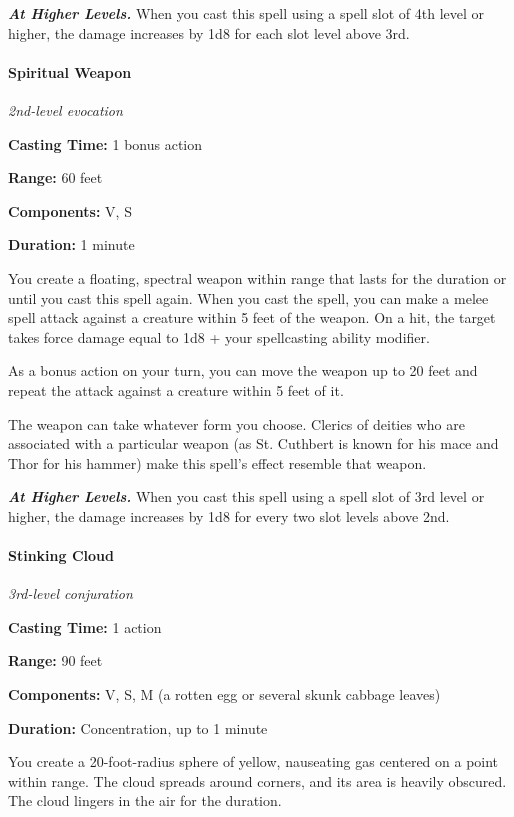 \documentclass[
]{article}
\begin{document}
\emph{\textbf{At Higher Levels.}} When you cast this spell using a spell
slot of 4th level or higher, the damage increases by 1d8 for each slot
level above 3rd.

\hypertarget{spiritual-weapon}{%
\paragraph{Spiritual Weapon}\label{spiritual-weapon}}

\emph{2nd-level evocation}

\textbf{Casting Time:} 1 bonus action

\textbf{Range:} 60 feet

\textbf{Components:} V, S

\textbf{Duration:} 1 minute

You create a floating, spectral weapon within range that lasts for the
duration or until you cast this spell again. When you cast the spell,
you can make a melee spell attack against a creature within 5 feet of
the weapon. On a hit, the target takes force damage equal to 1d8 + your
spellcasting ability modifier.

As a bonus action on your turn, you can move the weapon up to 20 feet
and repeat the attack against a creature within 5 feet of it.

The weapon can take whatever form you choose. Clerics of deities who are
associated with a particular weapon (as St. Cuthbert is known for his
mace and Thor for his hammer) make this spell's effect resemble that
weapon.

\emph{\textbf{At Higher Levels.}} When you cast this spell using a spell
slot of 3rd level or higher, the damage increases by 1d8 for every two
slot levels above 2nd.

\hypertarget{stinking-cloud}{%
\paragraph{Stinking Cloud}\label{stinking-cloud}}

\emph{3rd-level conjuration}

\textbf{Casting Time:} 1 action

\textbf{Range:} 90 feet

\textbf{Components:} V, S, M (a rotten egg or several skunk cabbage
leaves)

\textbf{Duration:} Concentration, up to 1 minute

You create a 20-foot-radius sphere of yellow, nauseating gas centered on
a point within range. The cloud spreads around corners, and its area is
heavily obscured. The cloud lingers in the air for the duration.
\end{document}
